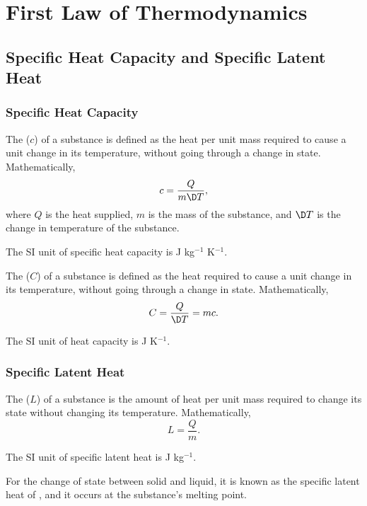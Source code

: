 \chapter{First Law of Thermodynamics}

\section{Specific Heat Capacity and Specific Latent Heat}

\subsection{Specific Heat Capacity}

\begin{definition}
    The  ($c$) of a substance is defined as the heat per unit mass required to cause a unit change in its temperature, without going through a change in state. Mathematically, \[c = \frac{Q}{m\D T},\] where $Q$ is the heat supplied, $m$ is the mass of the substance, and $\D T$ is the change in temperature of the substance.
\end{definition}

The SI unit of specific heat capacity is J kg$^{-1}$ K$^{-1}$.

\begin{definition}
    The  ($C$) of a substance is defined as the heat required to cause a unit change in its temperature, without going through a change in state. Mathematically, \[C = \frac{Q}{\D T} = mc.\]
\end{definition}

The SI unit of heat capacity is J K$^{-1}$.

\subsection{Specific Latent Heat}

\begin{definition}
    The  ($L$) of a substance is the amount of heat per unit mass required to change its state without changing its temperature. Mathematically, \[L = \frac{Q}{m}.\]
\end{definition}

The SI unit of specific latent heat is J kg$^{-1}$.

For the change of state between solid and liquid, it is known as the specific latent heat of , and it occurs at the substance's melting point.

